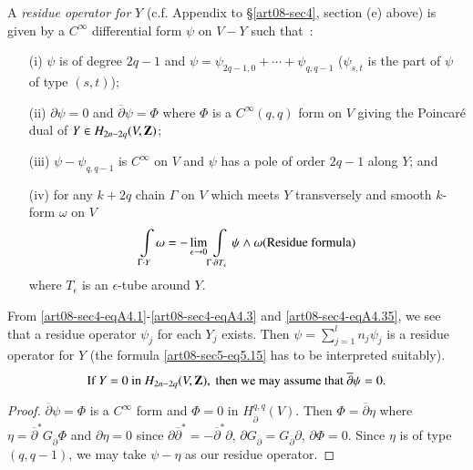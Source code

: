 A {\em residue operator for} $Y$ (c.f. Appendix to \S\ref{art08-sec4}, section (e) above) is given by a $C^{\infty}$ differential form $\psi$ on $V-Y$ such that~:
\begin{itemize}
\item[(i)] $\psi$ is of degree $2q-1$ and $\psi=\psi_{2q-1,0}+\cdots+\psi_{q,q-1}$ ($\psi_{s,t}$ is the part of $\psi$ of type $(s,t)$);

\item[(ii)] $\partial \psi=0$ and $\overline{\partial}\psi=\Phi$ where $\Phi$ is a $C^{\infty}(q,q)$ form on $V$ giving the Poincar\'e dual of $Y\in H_{2n-2q}(V,\mathbf{Z})$;

\item[(iii)] $\psi-\psi_{q,q-1}$ is $C^{\infty}$ on $V$ and $\psi$ has a pole of order $2q-1$ along $Y$; and

\item[(iv)] for any $k+2q$ chain $\Gamma$ on $V$ which meets $Y$ transversely and smooth $k$-form $\omega$ on $V$
\setcounter{equation}{14}
\begin{equation}
\int\limits_{\Gamma\cdot Y}\omega=-\lim\limits_{\epsilon\to 0}\int\limits_{\Gamma\cdot \partial T_{\epsilon}}\psi \wedge\omega (\textit{\em Residue formula})\label{art08-sec5-eq5.15}
\end{equation}
where $T_{\epsilon}$ is an $\epsilon$-tube around $Y$.
\end{itemize}

From \eqref{art08-sec4-eqA4.1}-\eqref{art08-sec4-eqA4.3} and \eqref{art08-sec4-eqA4.35}, we see that a residue operator $\psi_{j}$ for each $Y_{j}$ exists. Then $\psi=\sum\limits^{l}_{j=1}n_{j}\psi_{j}$ is a residue operator for $Y$ (the formula \eqref{art08-sec5-eq5.15} has to be interpreted suitably).
\begin{equation}
\text{If }Y=0\text{ in }H_{2n-2q}(V,\mathbf{Z}),\text{ then we may assume that } \overline{\partial}\psi=0.\label{art08-sec5-eq5.16}
\end{equation}

\begin{proof}
$\overline{\partial}\psi=\Phi$ is a $C^{\infty}$ form and $\Phi=0$ in $H^{q,q}_{\overline{\partial}}(V)$. Then $\Phi=\overline{\partial}\eta$ where $\eta=\overline{\partial}^{*}G_{\overline{\partial}}\Phi$ and $\partial \eta=0$ since $\partial \overline{\partial}^{*}=-\overline{\partial}^{*}\partial$, $\partial G_{\overline{\partial}}=G_{\overline{\partial}}\partial$, $\partial \Phi=0$. Since $\eta$ is of type $(q,q-1)$, we may take $\psi-\eta$ as our residue operator.
\end{proof}

